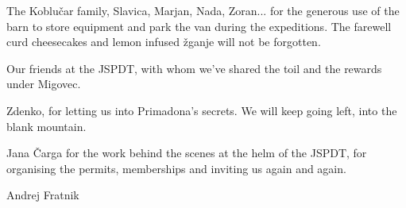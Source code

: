 \begin{citemize}
\item The Koblu\v{c}ar family, Slavica, Marjan, Nada, Zoran... for the generous use of the barn to store equipment and park the van during the expeditions. The farewell curd cheesecakes and lemon infused \v{z}ganje will not be forgotten.

\item Our friends at the JSPDT, with whom we've shared the toil and the rewards under Migovec.
\item Zdenko, for letting us into Primadona's secrets. We will keep going left, into the blank mountain.
\item Jana \v{C}arga for the work behind the scenes at the helm of the JSPDT, for organising the permits, memberships and inviting us again and again. 
\item Andrej Fratnik
\end{citemize}
